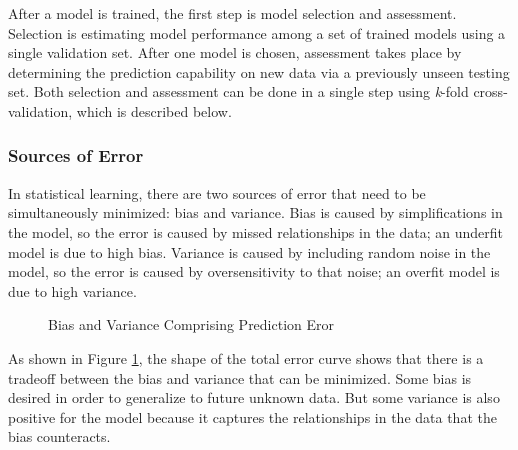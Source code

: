 After a model is trained, the first step is model selection and assessment.
Selection is estimating model performance among a set of trained models using a
single validation set.  After one model is chosen, assessment takes place by
determining the prediction capability on new data via a previously unseen
testing set. Both selection and assessment can be done in a single step using
\textit{k}-fold cross-validation, which is described below.

\subsubsection{Sources of Error} 

In statistical learning, there are two sources of error that need to be
simultaneously minimized: bias and variance. Bias is caused by simplifications
in the model, so the error is caused by missed relationships in the data; an
underfit model is due to high bias.  Variance is caused by including random
noise in the model, so the error is caused by oversensitivity to that noise; an
overfit model is due to high variance. 
\\
\begin{figure}[!htb]
  \caption{Bias and Variance Comprising Prediction Eror}
  \label{fig:bvtradeoff}
\end{figure}

As shown in Figure \ref{fig:bvtradeoff}, the shape of the total error curve
shows that there is a tradeoff between the bias and variance that can be
minimized. Some bias is desired in order to generalize to future unknown data.
But some variance is also positive for the model because it captures the
relationships in the data that the bias counteracts. 

